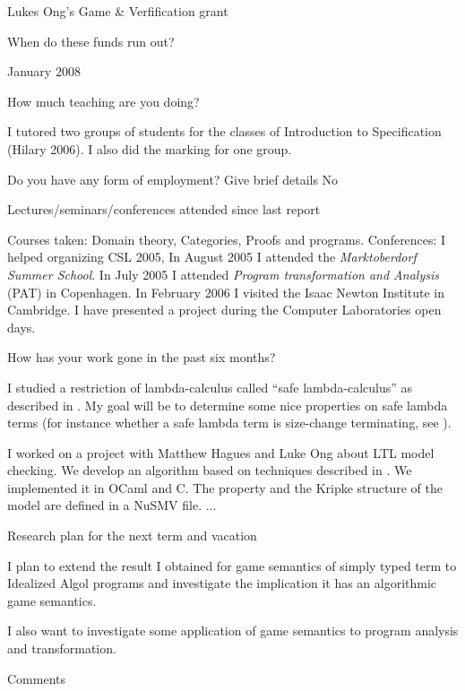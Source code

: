 \documentclass{article}
\def\answ#1{#1 \vspace{0.5em}}
\newcounter{SQcount}
\newenvironment{subq}{
\begin{list}
    {} %
    {   \usecounter{SQcount}
        \renewcommand{\makelabel}[1]{\stepcounter{SQcount} \textbf{\alph{SQcount}) \parbox[t]{0.8\linewidth}{{##1}}}  }
        \setlength{\rightmargin}{\leftmargin}
    }
}
{\end{list}}
\begin{document}
\begin{list}
\begin{subq}
    \answ{Lukes Ong's Game \& Verfification grant }

\item[When do these funds run out?] \

   \answ{January 2008}

\end{subq}

\item[How much teaching are you doing?] \

\answ{I tutored two groups of students for the classes of Introduction to Specification (Hilary 2006). I also did the marking for one group.}

\item[Do you have any form of employment? Give brief details]
\answ{No}

\item[Lectures/seminars/conferences attended since last report] \

\answ{Courses taken: Domain theory, Categories, Proofs and programs. Conferences: I helped organizing CSL 2005,
In August 2005 I attended the \emph{Marktoberdorf Summer School}. In July 2005 I attended \emph{Program transformation and Analysis} (PAT) in Copenhagen.
In February 2006 I visited the Isaac Newton Institute in Cambridge. I have presented a project during the Computer Laboratories open days.
}

\item[How has your work gone in the past six months?] \

\answ{
I studied a restriction of lambda-calculus called ``safe
lambda-calculus'' as described in \cite{safety-mirlong2004}. My goal
will be to determine some nice properties on safe lambda terms (for
instance whether a safe lambda term is size-change terminating, see
\cite{jones01,blum-mscthesis}).
}

\answ{
I worked on a project with Matthew Hagues and Luke Ong
about LTL model checking. We develop an algorithm based on techniques described in
\cite{DBLP:conf/cav/McMillan03, ckos2005, hammer:truly}. We implemented it in OCaml and C.
The property and the Kripke structure of the model are defined in a NuSMV file.
...
}

\item[Research plan for the next term and vacation] \

I plan to extend the result I obtained for game semantics of simply typed term to Idealized Algol programs and investigate
the implication it has an algorithmic game semantics.

I also want to investigate some application of game semantics to program analysis and transformation.


\item[Comments]

\end{list}



\end{document}
